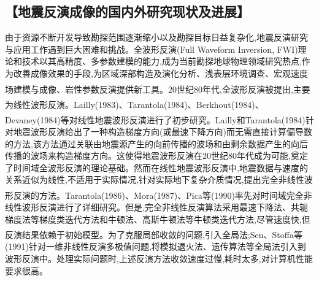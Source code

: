 \documentclass[11pt]{article}
\newcommand{\kai}{\CJKfamily{kai}}
\newcommand{\upcite}[1]{\textsuperscript{\textsuperscript{\cite{#1}}}}
\begin{document}
\subsection*{\kai\fontsize{11pt}{10pt} \selectfont【地震反演成像的国内外研究现状及进展】}
由于资源不断开发导致勘探范围逐渐缩小以及勘探目标日益复杂化,地震反演研究与应用工作遇到巨大困难和挑战。全波形反演(Full Waveform Inversion, FWI)理论和技术以其高精度、多参数建模的能力,成为当前勘探地球物理领域研究热点,作为改善成像效果的手段,为区域深部构造及演化分析、浅表层环境调查、宏观速度场建模与成像、岩性参数反演提供新工具\upcite{Virieux2009}。20世纪80年代,全波形反演被提出,主要为线性波形反演。Lailly\upcite{Lailly1983}(1983)、Tarantola\upcite{Tarantola1984}(1984)、Berkhout\upcite{Berkhout1984}(1984)、Devaney\upcite{Devancy1984}(1984)等对线性地震波形反演进行了初步研究。Lailly和Tarantola\upcite{Tarantola1984}(1984)针对地震波形反演给出了一种构造梯度方向(或最速下降方向)而无需直接计算偏导数的方法,该方法通过关联由地震源产生的向前传播的波场和由剩余数据产生的向后传播的波场来构造梯度方向。这使得地震波形反演在20世纪80年代成为可能,奠定了时间域全波形反演的理论基础。然而在线性地震波形反演中,地震数据与速度的关系近似为线性,不适用于实际情况,针对实际地下复杂介质情况,提出完全非线性波形反演的方法。Tarantola\upcite{Tarantola1986}(1986)、Mora\upcite{Mora1987}(1987)、Pica等\upcite{Pica1990}(1990)率先对时间域完全非线性波形反演进行了详细研究。但是,完全非线性反演算法采用最速下降法、共轭梯度法等梯度类迭代方法和牛顿法、高斯牛顿法等牛顿类迭代方法,尽管速度快,但反演结果依赖于初始模型。为了克服局部收敛的问题,引入全局法;Sen、Stoffa等\upcite{Sen1991}(1991)针对一维非线性反演多极值问题,将模拟退火法、遗传算法等全局法引入到波形反演中。处理实际问题时,上述反演方法收敛速度过慢,耗时太多,对计算机性能要求很高。
\par
\end{document}
